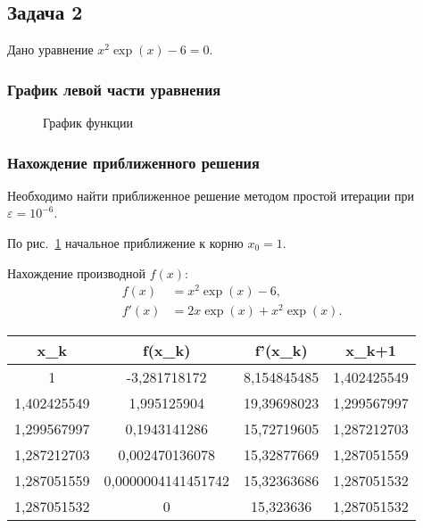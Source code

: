 \documentclass[10pt, a4paper, titlepage]{article}
\begin{document}
\subsection{Задача 2}

Дано уравнение $x^2\exp(x)-6=0$.

\subsubsection*{График левой части уравнения}
\begin{figure}[H]
    \centering
    \caption{График функции}
    \label{sr1Task2Function}
\end{figure}

\subsubsection*{Нахождение приближенного решения}

Необходимо найти приближенное решение методом простой итерации при $\varepsilon=10^{-6}$.

По рис.~\ref{sr1Task2Function} начальное приближение к корню $x_0=1$.

Нахождение производной $f(x)$:
\begin{align*}
f(x) &= x^2\exp(x)-6, \\ 
f'(x) &= 2x\exp(x)+x^2\exp(x).
\end{align*}

\begin{center}
    \begin{tabular}{|*{4}{C|}}
        \hline
        x_k & f(x_k) & f'(x_k) & x_{k+1} \\ \hline
        
        1 & -3,281718172 & 8,154845485 & 1,402425549 \\ \hline
        
        1,402425549 & 1,995125904 & 19,39698023 & 1,299567997 \\ \hline
        
        1,299567997 & 0,1943141286 & 15,72719605 & 1,287212703 \\ \hline
        
        1,287212703 & 0,002470136078 & 15,32877669 & 1,287051559 \\ \hline
        
        1,287051559 & 0,0000004141451742 & 15,32363686 & 1,287051532 \\ \hline
        
        1,287051532 & 0 & 15,323636 & 1,287051532 \\ \hline
        
    \end{tabular}
\end{center}
\end{document}
